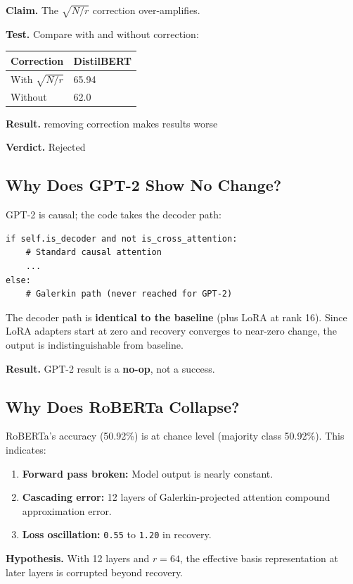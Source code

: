 \textbf{Claim.} The $\sqrt{N/r}$ correction over-amplifies.

\textbf{Test.} Compare with and without correction:

\begin{table}[H]
\centering
\small
\begin{tabular}{ll}
\toprule
\textbf{Correction} & \textbf{DistilBERT} \\
\midrule
With $\sqrt{N/r}$ & 65.94 \\
Without & 62.0 \\
\bottomrule
\end{tabular}
\end{table}

\textbf{Result.} removing correction makes results worse

\textbf{Verdict.} Rejected

\subsection{Why Does GPT-2 Show No Change?}

GPT-2 is causal; the code takes the decoder path:

\begin{lstlisting}
if self.is_decoder and not is_cross_attention:
    # Standard causal attention
    ...
else:
    # Galerkin path (never reached for GPT-2)
\end{lstlisting}

The decoder path is \textbf{identical to the baseline} (plus LoRA at rank 16). 
Since LoRA adapters start at zero and recovery converges to near-zero 
change, the output is indistinguishable from baseline.

\textbf{Result.} GPT-2 result is a \textbf{no-op}, not a success.

\subsection{Why Does RoBERTa Collapse?}

RoBERTa's accuracy (50.92\%) is at chance level (majority class 50.92\%). 
This indicates:

\begin{enumerate}
\item \textbf{Forward pass broken:} Model output is nearly constant.
\item \textbf{Cascading error:} 12 layers of Galerkin-projected attention compound
  approximation error.
\item \textbf{Loss oscillation:} \texttt{0.55} to \texttt{1.20} in recovery.

\end{enumerate}
\textbf{Hypothesis.} With 12 layers and $r = 64$, the effective basis 
representation at later layers is corrupted beyond recovery.

